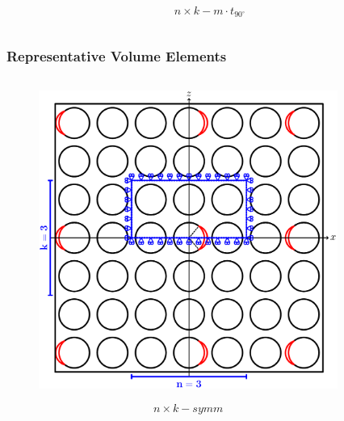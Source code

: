 \documentclass[first,firstsupp,lastsupp,last,hyperref,table]{ETHclass}
\begin{document}
\begin{frame}
\begin{columns}[c]
\begin{column}{0.45\textwidth}
\begin{figure}
\end{figure}
\vspace{-0.25cm}
\begin{equation*}
n\times  k-m\cdot t_{90^{\circ}}
\end{equation*}
\end{column}
\end{columns}
\end{frame}

\addtocounter{framenumber}{-1}

\begin{frame}
\frametitle{\vspace{0.2cm}\small Representative Volume Elements}
\vspace{-1.25cm}
\centering
\begin{columns}[c]
\begin{column}{0.5\textwidth}
\centering
\begin{figure}
\centering
\includegraphics[width=\columnwidth]{coupling.pdf}
\end{figure}
\begin{equation*}
n\times k-symm
\end{equation*}
\end{column}
\begin{column}{0.5\textwidth}
\centering
\begin{figure}

\end{figure}
\end{column}
\end{columns}
\end{frame}
\end{document}
